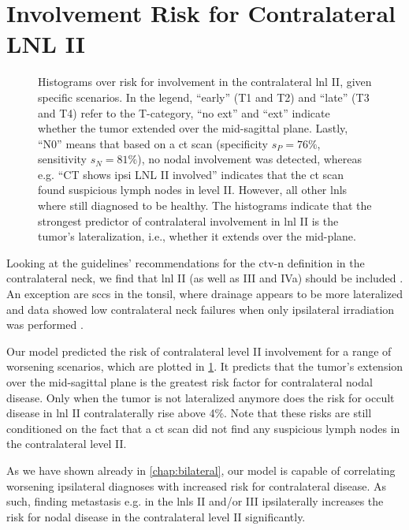 \documentclass[\relativeRoot/main.tex]{subfiles}
\begin{document}
\section{Involvement Risk for Contralateral LNL II}
\label{sec:complete:contraII}

\begin{figure}
    \centering
    \def\svgwidth{1.0\textwidth}
    
    \caption[
        Complete model's risk predictions for contralateral LNL II
    ]{
        Histograms over risk for involvement in the contralateral \gls{lnl} II, given specific scenarios. In the legend, ``early'' (T1 and T2) and ``late'' (T3 and T4) refer to the T-category, ``no ext'' and ``ext'' indicate whether the tumor extended over the mid-sagittal plane. Lastly, ``N0'' means that based on a \gls{ct} scan (specificity $s_P = 76\%$, sensitivity $s_N = 81\%$), no nodal involvement was detected, whereas e.g. ``CT shows ipsi LNL II involved'' indicates that the \gls{ct} scan found suspicious lymph nodes in level II. However, all other \glspl{lnl} where still diagnosed to be healthy. The histograms indicate that the strongest predictor of contralateral involvement in \gls{lnl} II is the tumor's lateralization, i.e., whether it extends over the mid-plane.
    }
    \label{fig:complete:contraII}
\end{figure}

Looking at the guidelines' recommendations for the \gls{ctv-n} definition in the contralateral neck, we find that \gls{lnl} II (as well as III and IVa) should be included \cite{biau_selection_2019}. An exception are \glspl{scc} in the tonsil, where drainage appears to be more lateralized and data showed low contralateral neck failures when only ipsilateral irradiation was performed \cite{huang_re-evaluation_2017}.

Our model predicted the risk of contralateral level II involvement for a range of worsening scenarios, which are plotted in \cref{fig:complete:contraII}. It predicts that the tumor's extension over the mid-sagittal plane is the greatest risk factor for contralateral nodal disease. Only when the tumor is not lateralized anymore does the risk for occult disease in \gls{lnl} II contralaterally rise above 4\%. Note that these risks are still conditioned on the fact that a \gls{ct} scan did not find any suspicious lymph nodes in the contralateral level II.

As we have shown already in \cref{chap:bilateral}, our model is capable of correlating worsening ipsilateral diagnoses with increased risk for contralateral disease. As such, finding metastasis e.g. in the \glspl{lnl} II and/or III ipsilaterally increases the risk for nodal disease in the contralateral level II significantly.
\end{document}
